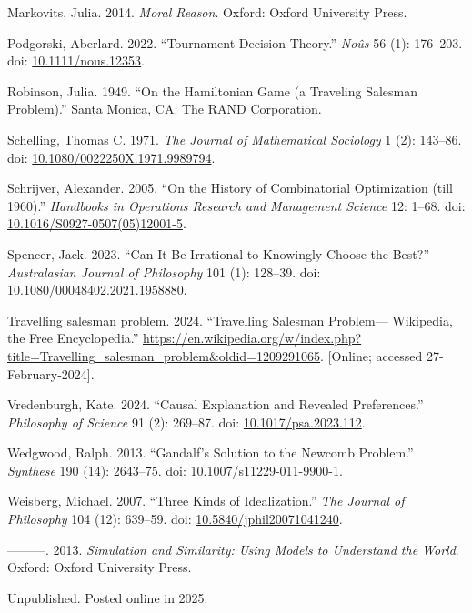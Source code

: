 \documentclass[
  11pt,
  letterpaper,
  DIV=11,
  numbers=noendperiod,
  twoside]{scrartcl}
\newlength{\cslhangindent}
\newenvironment{CSLReferences}[2] %
 {\begin{list}{}{%
  \setlength{\itemindent}{0pt}
  \setlength{\leftmargin}{0pt}
  \setlength{\parsep}{0pt}
  \ifodd #1
   \setlength{\leftmargin}{\cslhangindent}
   \setlength{\itemindent}{-1\cslhangindent}
  \fi
  \setlength{\itemsep}{#2\baselineskip}}}
 {\end{list}}
\begin{document}
\begin{CSLReferences}{1}{0}
Markovits, Julia. 2014. \emph{Moral Reason}. Oxford: Oxford University
Press.

Podgorski, Aberlard. 2022. {``Tournament Decision Theory.''}
\emph{No{û}s} 56 (1): 176--203. doi:
\href{https://doi.org/10.1111/nous.12353}{10.1111/nous.12353}.

Robinson, Julia. 1949. {``On the Hamiltonian Game (a Traveling Salesman
Problem).''} Santa Monica, CA: The RAND Corporation.

Schelling, Thomas C. 1971. \emph{The Journal of Mathematical Sociology}
1 (2): 143--86. doi:
\href{https://doi.org/10.1080/0022250X.1971.9989794}{10.1080/0022250X.1971.9989794}.

Schrijver, Alexander. 2005. {``On the History of Combinatorial
Optimization (till 1960).''} \emph{Handbooks in Operations Research and
Management Science} 12: 1--68. doi:
\href{https://doi.org/10.1016/S0927-0507(05)12001-5}{10.1016/S0927-0507(05)12001-5}.

Spencer, Jack. 2023. {``Can It Be Irrational to Knowingly Choose the
Best?''} \emph{Australasian Journal of Philosophy} 101 (1): 128--39.
doi:
\href{https://doi.org/10.1080/00048402.2021.1958880}{10.1080/00048402.2021.1958880}.

Travelling salesman problem. 2024. {``Travelling Salesman Problem---
{W}ikipedia{,} the Free Encyclopedia.''}
\url{https://en.wikipedia.org/w/index.php?title=Travelling_salesman_problem&oldid=1209291065}.
{[}Online; accessed 27-February-2024{]}.

Vredenburgh, Kate. 2024. {``Causal Explanation and Revealed
Preferences.''} \emph{Philosophy of Science} 91 (2): 269--87. doi:
\href{https://doi.org/10.1017/psa.2023.112}{10.1017/psa.2023.112}.

Wedgwood, Ralph. 2013. {``Gandalf's Solution to the Newcomb Problem.''}
\emph{Synthese} 190 (14): 2643--75. doi:
\href{https://doi.org/10.1007/s11229-011-9900-1}{10.1007/s11229-011-9900-1}.

Weisberg, Michael. 2007. {``Three Kinds of Idealization.''} \emph{The
Journal of Philosophy} 104 (12): 639--59. doi:
\href{https://doi.org/10.5840/jphil20071041240}{10.5840/jphil20071041240}.

---------. 2013. \emph{Simulation and Similarity: Using Models to
Understand the World}. Oxford: Oxford University Press.

\end{CSLReferences}



\noindent Unpublished. Posted online in 2025.
\end{document}
